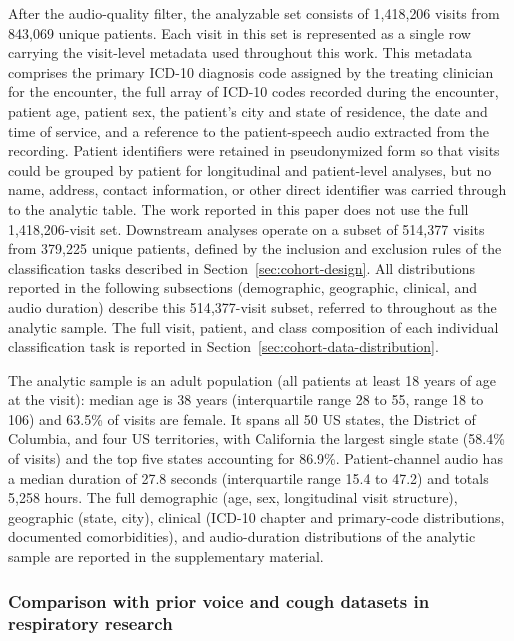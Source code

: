 \documentclass[utf8]{FrontiersinHarvard} %
\begin{document}
After the audio-quality filter, the analyzable set consists of 1{,}418{,}206 visits from 843{,}069 unique patients. Each visit in this set is represented as a single row carrying the visit-level metadata used throughout this work. This metadata comprises the primary ICD-10 diagnosis code assigned by the treating clinician for the encounter, the full array of ICD-10 codes recorded during the encounter, patient age, patient sex, the patient's city and state of residence, the date and time of service, and a reference to the patient-speech audio extracted from the recording. Patient identifiers were retained in pseudonymized form so that visits could be grouped by patient for longitudinal and patient-level analyses, but no name, address, contact information, or other direct identifier was carried through to the analytic table. The work reported in this paper does not use the full 1{,}418{,}206-visit set. Downstream analyses operate on a subset of 514{,}377 visits from 379{,}225 unique patients, defined by the inclusion and exclusion rules of the classification tasks described in Section~\ref{sec:cohort-design}. All distributions reported in the following subsections (demographic, geographic, clinical, and audio duration) describe this 514{,}377-visit subset, referred to throughout as the analytic sample. The full visit, patient, and class composition of each individual classification task is reported in Section~\ref{sec:cohort-data-distribution}.

The analytic sample is an adult population (all patients at least 18 years of age at the visit): median age is 38 years (interquartile range 28 to 55, range 18 to 106) and 63.5\% of visits are female. It spans all 50 US states, the District of Columbia, and four US territories, with California the largest single state (58.4\% of visits) and the top five states accounting for 86.9\%. Patient-channel audio has a median duration of 27.8 seconds (interquartile range 15.4 to 47.2) and totals 5{,}258 hours. The full demographic (age, sex, longitudinal visit structure), geographic (state, city), clinical (ICD-10 chapter and primary-code distributions, documented comorbidities), and audio-duration distributions of the analytic sample are reported in the supplementary material.

\subsubsection{Comparison with prior voice and cough datasets in respiratory research}
\label{sec:related}
\end{document}
